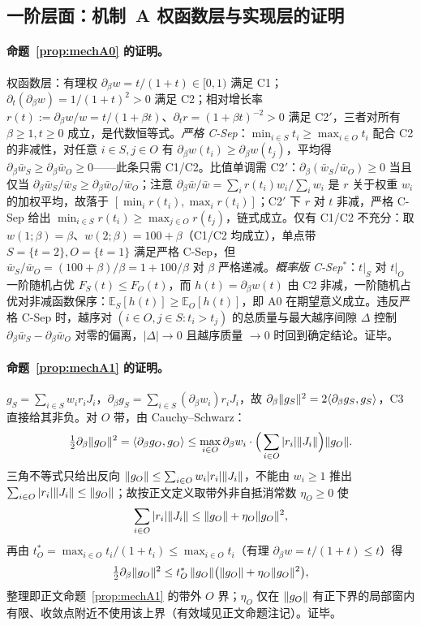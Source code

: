 \documentclass[fontset=windows,11pt]{ctexart}
\DeclarePairedDelimiter{\norm}{\lVert}{\rVert}
\numberwithin{equation}{section}
\begin{document}
\subsection{一阶层面：机制~A 权函数层与实现层的证明}
\paragraph{命题~\ref{prop:mechA0} 的证明。}
权函数层：有理权 $\partial_\beta w=t/(1+t)\in[0,1)$ 满足 C1；$\partial_t(\partial_\beta w)=1/(1+t)^2>0$ 满足 C2；相对增长率 $r(t):=\partial_\beta w/w=t/(1+\beta t)$、$\partial_t r=(1+\beta t)^{-2}>0$ 满足 C2$'$，三者对所有 $\beta\ge1,t\ge0$ 成立，是代数恒等式。\emph{严格 C-Sep}：$\min_{i\in S}t_i\ge\max_{i\in O}t_i$ 配合 C2 的非减性，对任意 $i\in S,j\in O$ 有 $\partial_\beta w(t_i)\ge\partial_\beta w(t_j)$，平均得 $\partial_\beta\bar w_S\ge\partial_\beta\bar w_O\ge0$——此条只需 C1/C2。比值单调需 C2$'$：$\partial_\beta(\bar w_S/\bar w_O)\ge0$ 当且仅当 $\partial_\beta\bar w_S/\bar w_S\ge\partial_\beta\bar w_O/\bar w_O$；注意 $\partial_\beta\bar w/\bar w=\sum_i r(t_i)w_i\big/\sum_i w_i$ 是 $r$ 关于权重 $w_i$ 的加权平均，故落于 $[\min_i r(t_i),\max_i r(t_i)]$；C2$'$ 下 $r$ 对 $t$ 非减，严格 C-Sep 给出 $\min_{i\in S}r(t_i)\ge\max_{j\in O}r(t_j)$，链式成立。仅有 C1/C2 不充分：取 $w(1;\beta)=\beta$、$w(2;\beta)=100+\beta$（C1/C2 均成立），单点带 $S=\{t=2\},O=\{t=1\}$ 满足严格 C-Sep，但 $\bar w_S/\bar w_O=(100+\beta)/\beta=1+100/\beta$ 对 $\beta$ 严格递减。\emph{概率版 C-Sep$^*$}：$t|_S$ 对 $t|_O$ 一阶随机占优 $F_S(t)\le F_O(t)$，而 $h(t)=\partial_\beta w(t)$ 由 C2 非减，一阶随机占优对非减函数保序\cite{Strassen1965}：$\mathbb E_S[h(t)]\ge\mathbb E_O[h(t)]$，即 A0 在期望意义成立。违反严格 C-Sep 时，越序对 $(i\in O,j\in S:t_i>t_j)$ 的总质量与最大越序间隙 $\Delta$ 控制 $\partial_\beta\bar w_S-\partial_\beta\bar w_O$ 对零的偏离，$|\Delta|\to0$ 且越序质量 $\to0$ 时回到确定结论。证毕。

\paragraph{命题~\ref{prop:mechA1} 的证明。}
$g_S=\sum_{i\in S}w_ir_iJ_i$，$\partial_\beta g_S=\sum_{i\in S}(\partial_\beta w_i)r_iJ_i$，故 $\partial_\beta\norm{g_S}^2=2\langle\partial_\beta g_S,g_S\rangle$，C3 直接给其非负。对 $O$ 带，由 Cauchy--Schwarz：
\[
\tfrac12\partial_\beta\norm{g_O}^2=\langle\partial_\beta g_O,g_O\rangle
\le\max_{i\in O}\partial_\beta w_i\cdot\Big(\sum_{i\in O}|r_i|\norm{J_i}\Big)\norm{g_O}.
\]
三角不等式只给出反向 $\norm{g_O}\le\sum_{i\in O}w_i|r_i|\norm{J_i}$，不能由 $w_i\ge1$ 推出 $\sum_{i\in O}|r_i|\norm{J_i}\le\norm{g_O}$；故按正文定义取带外非自抵消常数 $\eta_O\ge0$ 使
\[
\sum_{i\in O}|r_i|\norm{J_i}\le\norm{g_O}+\eta_O\norm{g_O}^2,
\]
再由 $t_O^*=\max_{i\in O}t_i/(1+t_i)\le\max_{i\in O}t_i$（有理 $\partial_\beta w=t/(1+t)\le t$）得
\[
\tfrac12\partial_\beta\norm{g_O}^2\le t_O^*\,\norm{g_O}\big(\norm{g_O}+\eta_O\norm{g_O}^2\big),
\]
整理即正文命题~\ref{prop:mechA1} 的带外 $O$ 界；$\eta_O$ 仅在 $\norm{g_O}$ 有正下界的局部窗内有限、收敛点附近不使用该上界（有效域见正文命题注记）。证毕。
\end{document}
